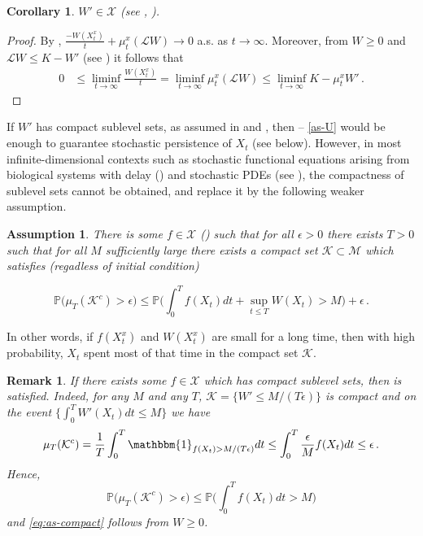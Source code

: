 \documentclass[final]{amsart}
\newtheorem{ass}{Assumption}[]
\newtheorem{cor}[thm]{Corollary}
\newtheorem{rem}[thm]{Remark}
\numberwithin{thm}{section}
\numberwithin{equation}{section}
\newcommand{\Prb}{\mathbb{P}}
\newcommand{\mcM}{\mathcal{M}}
\newcommand{\Id}{\mathbbm{1}}
\newcommand{\K}{\mathcal{K}}
\newcommand{\X}{\mathcal{X}}
\begin{document}
\begin{cor}\label{muW'-K}
$W' \in \X$ (see , ).
    
\end{cor}
\begin{proof}
    By , $\frac{-W(X_t^x)}{t} + \mu_t^x(\mathcal{L}W) \to 0$ a.s. as $t \to \infty$. Moreover, from $W \geq 0$ and $\mathcal{L}W \leq K - W'$ (see ) it follows that
    \begin{align*}
        0 &\leq \liminf_{t \to \infty} \frac{W(X_t^x)}{t} = \liminf_{t \to \infty} \mu_t^x(\mathcal{L}W) 
        \leq \liminf_{t \to \infty} K - \mu_t^x W'     \,.   
    \end{align*}
    
    
\end{proof}


If $W'$ has compact sublevel sets, as assumed in \cite{extinction} and \cite{persistence}, then  -- \ref{as-U} would be enough to guarantee stochastic persistence of $X_t$ (see  below). However, in most infinite-dimensional contexts such as stochastic functional equations arising from biological systems with delay () and stochastic PDEs (see ), the compactness of sublevel sets cannot be obtained, and replace it by the following weaker assumption.


\begin{ass}
    \label{as-compact} There is some $f \in \X$ () such that for all $\epsilon > 0$ there exists $T > 0$ such that for all $M$ sufficiently large there exists a compact set $\K \subset \mcM$ which satisfies (regadless of initial condition)
    
    \begin{equation}\label{eq:as-compact}
        \Prb\Big(\mu_T(\K^c) > \epsilon \Big) \leq \Prb\Big(\int_0^Tf(X_t)dt + \sup_{t \leq T}W(X_t) > M \Big) + \epsilon \,.
    \end{equation}
    
\end{ass}

In other words, if $f(X^x_t)$ and $W(X^x_t)$ are small for a long time, then with high  probability, $X_t$ spent most of that time in the compact set $\K$.

\begin{rem}\label{compact-sublevel}
    If there exists some $f\in \X$ which has compact sublevel sets, then  is satisfied. Indeed,  for any $M$ and any $T$, $\K = \{W' \leq M/(T\epsilon)\}$ is compact and on the event $\{\int_0^T W'(X_t) dt \leq M\}$ we have
    $$
    \mu_T(\K^c) = \frac{1}{T}\int_0^T \Id_{f(X_t) > M/(T\epsilon)}dt \leq \int_0^T \frac{\epsilon}{M}f(X_t)dt 
    \leq \epsilon\,.
    $$
    Hence, 
    \begin{equation}
      \Prb\Big(\mu_T(\K^c) > \epsilon \Big) \leq \Prb\Big(\int_0^Tf(X_t)dt  > M \Big)  
    \end{equation}
    and \eqref{eq:as-compact} follows from $W \geq 0$.
\end{rem}
\end{document}
